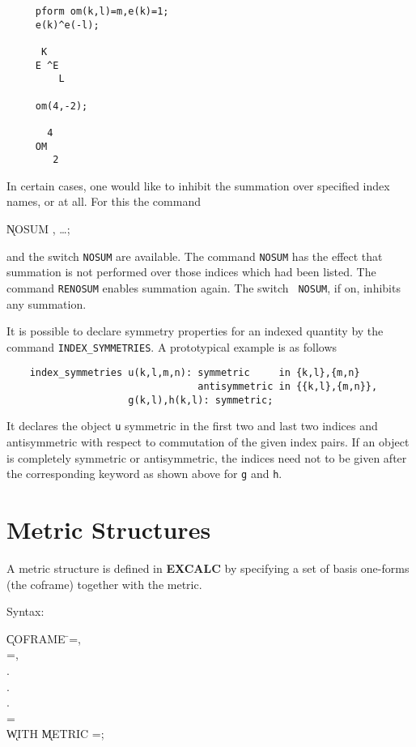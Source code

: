 \documentclass[11pt,letterpaper]{book}
\begin{document}
{\small\begin{verbatim}
     pform om(k,l)=m,e(k)=1;
     e(k)^e(-l);

      K
     E ^E
         L

     om(4,-2);

       4
     OM
        2
\end{verbatim}}

In certain cases, one would like to inhibit the summation over
specified index names, or at all.  For this the command

\hspace*{2em} \k{NOSUM} , \ldots;\label{NOSUM}

and the switch {\tt NOSUM} are
available.  The command {\tt NOSUM} has the effect that summation is
not performed over those indices which had been listed.  The command
{\tt RENOSUM}\label{RENOSUM} enables summation again.  The switch {\tt
NOSUM}, if on, inhibits any summation.

\label{INDEXSYMMETRIES}
It is possible to declare symmetry properties for an indexed quantity by
the command {\tt INDEX\_SYMMETRIES}. A prototypical example is as
follows

{\small\begin{verbatim}
    index_symmetries u(k,l,m,n): symmetric     in {k,l},{m,n}
                                 antisymmetric in {{k,l},{m,n}},
                     g(k,l),h(k,l): symmetric;
\end{verbatim}}

It declares the object {\tt u} symmetric in the first two and last
two indices and antisymmetric with respect to commutation of the given
index pairs. If an object is completely symmetric or antisymmetric,
the indices need not to be given after the corresponding keyword as
shown above for {\tt g} and {\tt h}.

\section{Metric Structures}

A metric structure is defined in {\bf EXCALC} by specifying a set of
basis one-forms (the coframe) together with the metric.

Syntax:\label{COFRAME}

\begin{tabbing}
\hspace*{2em} \k{COFRAME} \=
=, \\
\> =, \\
\> . \\
\> . \\
\> . \\
\> = \\
\> \hspace{1em} \k{WITH} \k{METRIC} =; \\
\end{tabbing}
\end{document}
